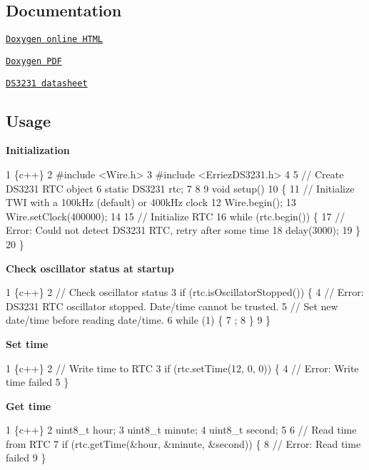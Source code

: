 \subsection*{Documentation}


\begin{DoxyItemize}
\item \href{https://erriez.github.io/ErriezDS3231}{\tt Doxygen online H\+T\+ML}
\item \href{https://github.com/Erriez/ErriezDS3231/raw/gh-pages/latex/ErriezDS3231.pdf}{\tt Doxygen P\+DF}
\item \href{https://github.com/Erriez/ErriezDS3231/blob/master/extras/DS3231.pdf}{\tt D\+S3231 datasheet}
\end{DoxyItemize}

\subsection*{Usage}

{\bfseries Initialization}


\begin{DoxyCode}
1 \{c++\}
2 #include <Wire.h>
3 #include <ErriezDS3231.h>
4 
5 // Create DS3231 RTC object
6 static DS3231 rtc;
7 
8 
9 void setup()
10 \{
11     // Initialize TWI with a 100kHz (default) or 400kHz clock
12     Wire.begin();
13     Wire.setClock(400000);
14 
15     // Initialize RTC
16     while (rtc.begin()) \{
17         // Error: Could not detect DS3231 RTC, retry after some time
18         delay(3000);
19     \}
20 \}
\end{DoxyCode}


{\bfseries Check oscillator status at startup}


\begin{DoxyCode}
1 \{c++\}
2 // Check oscillator status
3 if (rtc.isOscillatorStopped()) \{
4     // Error: DS3231 RTC oscillator stopped. Date/time cannot be trusted. 
5     // Set new date/time before reading date/time.
6     while (1) \{
7         ;
8     \}
9 \}
\end{DoxyCode}


{\bfseries Set time}


\begin{DoxyCode}
1 \{c++\}
2 // Write time to RTC
3 if (rtc.setTime(12, 0, 0)) \{
4     // Error: Write time failed
5 \}
\end{DoxyCode}


{\bfseries Get time}


\begin{DoxyCode}
1 \{c++\}
2 uint8\_t hour;
3 uint8\_t minute;
4 uint8\_t second;
5 
6 // Read time from RTC
7 if (rtc.getTime(&hour, &minute, &second)) \{
8     // Error: Read time failed
9 \}
\end{DoxyCode}


